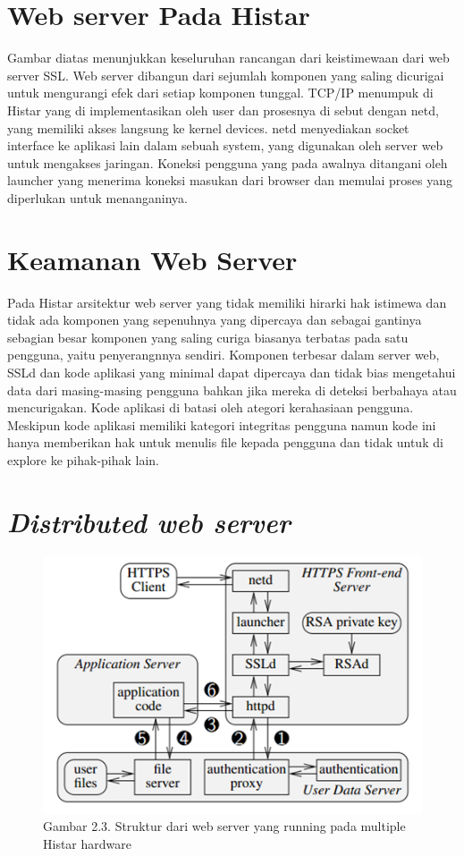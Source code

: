 \documentclass{jtetiproposalskripsi}
\begin{document}
\section{Web server Pada Histar}
Gambar diatas menunjukkan keseluruhan rancangan dari keistimewaan dari web server SSL. Web server dibangun dari sejumlah komponen yang saling dicurigai untuk mengurangi efek dari setiap komponen tunggal. TCP/IP menumpuk di Histar yang di implementasikan oleh user dan prosesnya di sebut dengan netd, yang memiliki akses langsung ke kernel devices. netd menyediakan socket interface ke aplikasi lain dalam sebuah system, yang digunakan oleh server web untuk mengakses jaringan. Koneksi pengguna yang pada awalnya ditangani oleh launcher yang menerima koneksi masukan dari browser dan memulai proses yang diperlukan untuk menanganinya.
\section{Keamanan Web Server} 
Pada Histar arsitektur web server yang tidak memiliki hirarki hak istimewa dan tidak ada komponen yang sepenuhnya yang dipercaya dan sebagai gantinya sebagian besar komponen yang saling curiga biasanya terbatas pada satu pengguna, yaitu penyerangnnya sendiri. Komponen terbesar dalam server web, SSLd dan kode aplikasi yang minimal dapat dipercaya dan tidak bias mengetahui data dari masing-masing pengguna bahkan jika mereka di deteksi berbahaya atau mencurigakan. Kode aplikasi di batasi oleh ategori kerahasiaan pengguna. Meskipun kode aplikasi memiliki kategori integritas pengguna namun kode ini hanya memberikan hak untuk menulis file kepada pengguna dan tidak untuk di explore ke pihak-pihak lain.

\section{\emph{Distributed web server}}

\begin{figure}[ht!]
  \centering
    \includegraphics{gambar/web}
    \caption{Gambar 2.3. Struktur dari web server yang running pada multiple Histar hardware}
    \label{star}
\end{figure}
\end{document}
